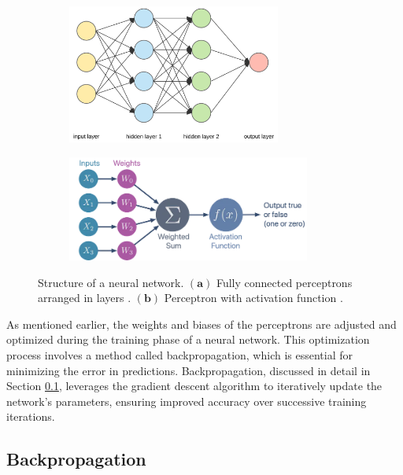 \begin{figure}[H]
    \centering
    \begin{subfigure}{0.45\textwidth}
        \includegraphics[width=7cm]{Cap2_LitReview/model_basics/Neural_networks/neural_network.png}
        \caption{}
        \label{fig:neural_network-a}
    \end{subfigure}
    \hspace{0.2cm}
    \begin{subfigure}{0.45\textwidth}
        \includegraphics[width=8cm]{Cap2_LitReview/model_basics/Neural_networks/perceptron.png}
        \caption{}
        \label{fig:neural_network-b}
    \end{subfigure}
    \caption{Structure of a neural network. $\boldsymbol{(a)}$ Fully connected perceptrons arranged in layers \cite{P._2025}. $\boldsymbol{(b)}$ Perceptron with activation function \cite{Weaver_2024}.}
    \label{fig:neural_network}
\end{figure}

As mentioned earlier, the weights and biases of the perceptrons are adjusted and optimized during the training phase of a neural network. This optimization process involves a method called backpropagation, which is essential for minimizing the error in predictions. Backpropagation, discussed in detail in Section \ref{sec-backpropagation}, leverages the gradient descent algorithm to iteratively update the network's parameters, ensuring improved accuracy over successive training iterations.

\subsection{Backpropagation} \label{sec-backpropagation}


